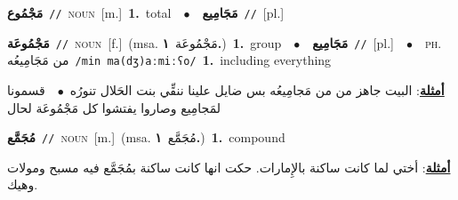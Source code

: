 \documentclass[10pt,a4paper,twoside]{article} %
\begin{document}
\begin{multicols}{2}
{\setlength\topsep{0pt}\textbf{\foreignlanguage{arabic}{مَجْمُوع}}\ {\color{gray}\texttt{//}\color{black}}\ \textsc{noun}\ [m.]\ \textbf{1.}~total\ \ $\bullet$\ \ \setlength\topsep{0pt}\textbf{\foreignlanguage{arabic}{مَجَامِيع}}\ {\color{gray}\texttt{//}\color{black}}\ [pl.]\ } \vspace{2mm}

{\setlength\topsep{0pt}\textbf{\foreignlanguage{arabic}{مَجْمُوعَة}}\ {\color{gray}\texttt{//}\color{black}}\ \textsc{noun}\ [f.]\ \color{gray}(msa. \foreignlanguage{arabic}{مَجْمُوعَة}~\foreignlanguage{arabic}{\textbf{١.}})\color{black}\ \textbf{1.}~group\ \ $\bullet$\ \ \setlength\topsep{0pt}\textbf{\foreignlanguage{arabic}{مَجَامِيع}}\ {\color{gray}\texttt{//}\color{black}}\ [pl.]\ \ $\bullet$\ \ \textsc{ph.} \color{gray} \foreignlanguage{arabic}{من مَجَامِيعُه}\color{black}\ {\color{gray}\texttt{/{\sffamily min ma(dʒ)aːmiːʕo}/}\color{black}}\ \textbf{1.}~including everything\  \begin{flushright}\color{gray}\foreignlanguage{arabic}{\textbf{\underline{\foreignlanguage{arabic}{أمثلة}}}: البيت جاهز من من مَجامِيعُه بس ضايل علينا ننقِّي بنت الحَلال تنورُه\ $\bullet$\ \  قسمونا لمَجامِيع وصاروا يفتشوا كل مَجْمُوعَة لحال}\end{flushright}\color{black}} \vspace{2mm}

{\setlength\topsep{0pt}\textbf{\foreignlanguage{arabic}{مُجَمَّع}}\ {\color{gray}\texttt{//}\color{black}}\ \textsc{noun}\ [m.]\ \color{gray}(msa. \foreignlanguage{arabic}{مُجَمَّع}~\foreignlanguage{arabic}{\textbf{١.}})\color{black}\ \textbf{1.}~compound\  \begin{flushright}\color{gray}\foreignlanguage{arabic}{\textbf{\underline{\foreignlanguage{arabic}{أمثلة}}}: أختي لما كانت ساكنة بالإِمارات. حكت انها كانت ساكنة بمُجَمَّع فيه مسبح ومولات وهيك.}\end{flushright}\color{black}} \vspace{2mm}


\end{multicols}
\end{document}
